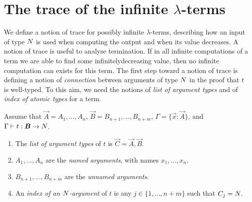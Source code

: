 
\section{The trace of the infinite $\lambda$-terms}
We define a notion of trace for possibly infinite $\lambda$-terms, 
describing how an input of type ${N}$ is used when computing the output
and when its value decreases. A notion of trace is useful to analyse termination.
If in all infinite computations of a term we are able to find some infinitelydecreasing value, then no infinite computation can exists for this term. 
The first step toward a notion of  trace is defining a notion of \emph{connection} 
between arguments of type ${N}$ in the proof that $t$ is well-typed. 
To this aim, we need the notions of \emph{list of argument
 types} and of \emph{index of atomic types} for a term.

%
%


\begin{definition}
Assume that $\vec{A} = A_1, \ldots, A_n$, $\vec{B}=B_{n+1}, \ldots, B_{n+m}$, 
$\Gamma = \{\vec{x}:\vec{A}\}$,
and $\Gamma \vdash t: \vec{B} \rightarrow \N$.

\begin{enumerate}
\item
The \emph{list of argument types} of $t$ is $\vec{C} = \vec{A},\vec{B}$. 

\item
$A_1, \ldots, A_n$ are the \emph{named arguments}, 
with names $x_1, \ldots, x_n$.

\item
$B_{n+1}, \ldots, B_{n+m}$ are the \emph{unnamed arguments}.

\item
An \emph{index of an ${N}$-argument} 
of $t$ is any $j \in \{1, \ldots, n+m\}$ such that $C_j = {N}$.

\end{enumerate}
\end{definition}

